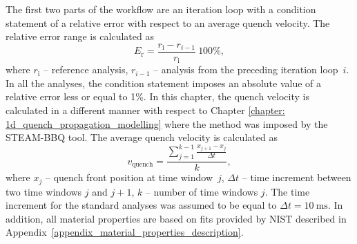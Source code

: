 The first two parts of the workflow are an iteration loop with a condition statement of a relative error with respect to an average quench velocity. The relative error range is calculated as 
\begin{equation}
    E_\text{r} = \frac{r_\text{i}-r_{i-1}}{r_\text{i}}~100\%,
\end{equation}
where $r_\text{i}$ -- reference analysis, $r_{i-1}$ -- analysis from the preceding iteration loop~$i$. In all the analyses, the condition statement imposes an absolute value of a relative error less or equal to 1\%. In this chapter, the quench velocity is calculated in a different manner with respect to Chapter \ref{chapter: 1d_quench_propagation_modelling} where the method was imposed by the STEAM-BBQ tool. The average quench velocity is calculated as
\begin{equation}
    v_\text{quench} = \frac{ \sum_{j=1}^{k-1} \frac{x_{j+1}-x_j}{\Delta t} }{k},
\end{equation}
where $x_j$ -- quench front position at time window~$j$, $\Delta t$ -- time increment between two time windows $j$ and $j+1$, $k$ -- number of time windows $j$. The time increment for the standard analyses was assumed to be equal to $\Delta t=10~\text{ms}$. In addition, all material properties are based on fits provided by NIST described in Appendix~\ref{appendix_material_properties_description}.

